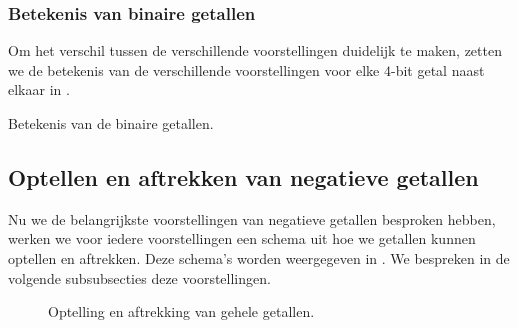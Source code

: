 \subsubsection{Betekenis van binaire getallen}
Om het verschil tussen de verschillende voorstellingen duidelijk te maken, zetten we de betekenis van de verschillende voorstellingen voor elke $4$-bit getal naast elkaar in .

\begin{table}[hbt]
\centering
{}
\caption{Betekenis van de binaire getallen.}
\end{table}

\subsection{Optellen en aftrekken van negatieve getallen}
Nu we de belangrijkste voorstellingen van negatieve getallen besproken hebben, werken we voor iedere voorstellingen een schema uit hoe we getallen kunnen optellen en aftrekken. Deze schema's worden weergegeven in . We bespreken in de volgende subsubsecties deze voorstellingen.

\begin{figure}[hbt]
\centering
{}
\caption{Optelling en aftrekking van gehele getallen.}
\end{figure}

